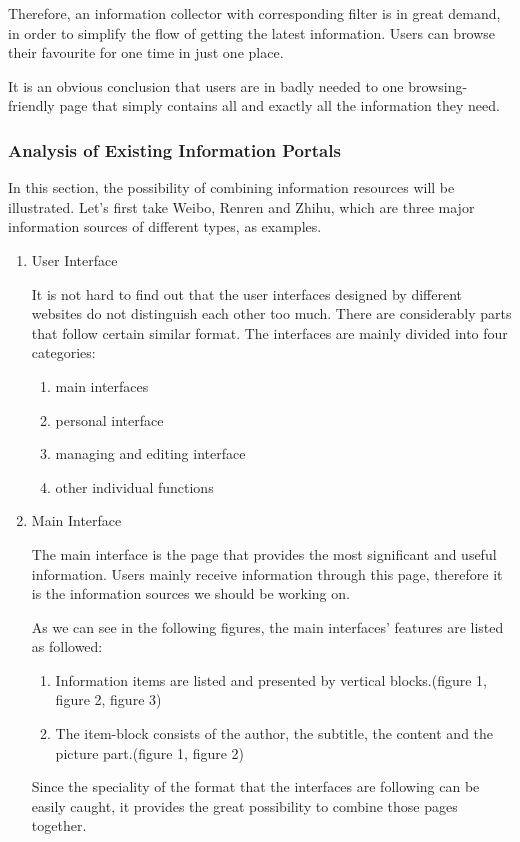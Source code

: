    Therefore, an information collector with corresponding filter is in great demand,
   in order to simplify the flow of getting the latest information.
   Users can browse their favourite for one time in just one place.

   It is an obvious conclusion that users are in badly needed to one browsing-friendly
   page that simply contains all and exactly all the information they need.

\subsubsection{Analysis of Existing Information Portals}
In this section, the possibility of combining information resources will be illustrated.
Let’s first take Weibo, Renren and Zhihu, which are three major information sources of different types,
as examples.

\begin{enumerate}
  \item User Interface

It is not hard to find out that the user interfaces
designed by different websites do not distinguish each other too much.
There are considerably parts that follow certain similar format.
The interfaces are mainly divided into four categories:
\begin{enumerate}
  \item main interfaces
  \item personal interface
  \item managing and editing interface
  \item other individual functions
\end{enumerate}

\item Main Interface

    The main interface is the page that provides the most significant
    and useful information.
    Users mainly receive information through this page, therefore it is the
    information sources we should be working on.

    As we can see in the following figures, the main interfaces’ features are listed as followed:

\begin{enumerate}

  \item  Information items are listed and presented by vertical blocks.(figure 1, figure 2, figure 3)

  \item The item-block consists of the author, the subtitle, the content and the picture part.(figure 1, figure 2)
\end{enumerate}

    Since the speciality of the format
    that the interfaces are following can be easily caught,
    it provides the great possibility to combine those pages together.

\end{enumerate}

